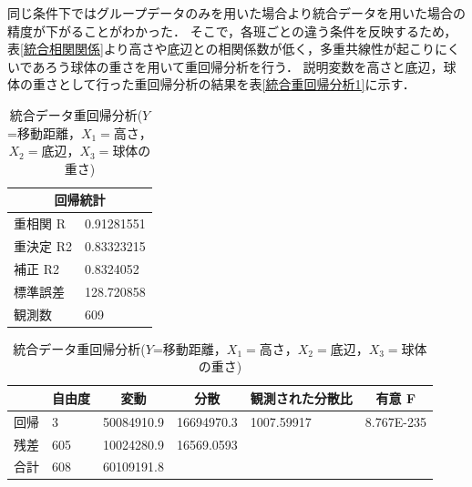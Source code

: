 \documentclass[titlepage,a4paper]{jsarticle}
\begin{document}
同じ条件下ではグループデータのみを用いた場合より統合データを用いた場合の精度が下がることがわかった．
そこで，各班ごとの違う条件を反映するため，表\ref{統合相関関係}より高さや底辺との相関係数が低く，多重共線性が起こりにくいであろう球体の重さを用いて重回帰分析を行う．
説明変数を高さと底辺，球体の重さとして行った重回帰分析の結果を表\ref{統合重回帰分析1}に示す．
\begin{table}[H]%
  \centering
  \caption{統合データ重回帰分析($Y$=移動距離，$X_{1}=$高さ，$X_{2}=$底辺，$X_{3}=$球体の重さ)}
  \label{統合重回帰分析1}
  \begin{minipage}[c]{0.5\hsize}
    \centering
    \label{sub統合回帰統計1}
    \begin{tabular}{l|l}
      \multicolumn{2}{c}{回帰統計} \\\hline\hline
      重相関 R  & 0.91281551      \\
      重決定 R2 & 0.83323215      \\
      補正 R2  & 0.8324052       \\
      標準誤差   & 128.720858      \\
      観測数    & 609             \\\hline
    \end{tabular}
  \end{minipage}
  \begin{minipage}[c]{1\hsize}
    \centering
    \label{sub1統合分析1}
    \begin{tabular}{l|lllll}
      \multicolumn{1}{c|}{} & \multicolumn{1}{c}{自由度} & \multicolumn{1}{c}{変動} & \multicolumn{1}{c}{分散} & \multicolumn{1}{c}{観測された分散比} & \multicolumn{1}{c}{有意 F} \\\hline\hline
      回帰                    & 3                       & 50084910.9             & 16694970.3             & 1007.59917                   & 8.767E-235               \\
      残差                    & 605                     & 10024280.9             & 16569.0593             &                              &                          \\
      合計                    & 608                     & 60109191.8             &                        &                              &                          \\\hline
    \end{tabular}
  \end{minipage}
  \begin{minipage}[c]{1\hsize}

\end{minipage}
\end{table}
\end{document}
